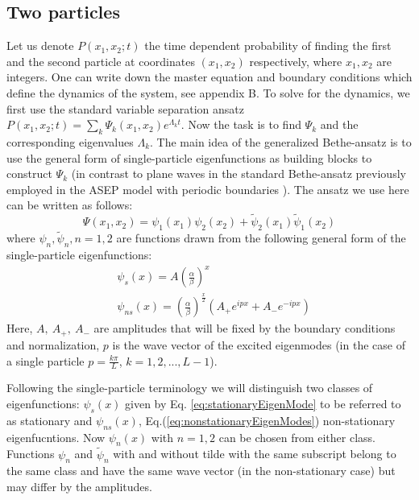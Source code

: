 \documentclass[aps,showpacs,twocolumn,floatfix,prx,superscriptaddress]{revtex4-1}
\begin{document}
\subsection{Two particles}
Let us denote $P(x_1, x_2; t)$ the time dependent probability of finding the first and the second particle at coordinates $(x_1, x_2)$ respectively, where $x_1, x_2$ are integers. One can write down the master equation and boundary conditions which define the dynamics of the system, see appendix B. To solve for the dynamics, we first use the standard variable separation ansatz $P(x_1, x_2; t) = \sum_k { \Psi_k(x_1, x_2) e^{\Lambda_k t}}$. Now the task is to find $\Psi_k$ and the corresponding eigenvalues $\Lambda_k$. The main idea of the generalized Bethe-ansatz is to use the general form of single-particle eigenfunctions as building blocks to construct $\Psi_k$ (in contrast to plane waves in the standard Bethe-ansatz previously employed in the ASEP model with periodic boundaries \cite{Derrida1998,Mallick2011}). The ansatz we use here can be written as follows:
\begin{equation}
    \label{eq:ansatzTwo}
    \Psi(x_1, x_2) = \psi_1(x_1)\psi_2(x_2) + \tilde{\psi}_2(x_1)\tilde{\psi}_1(x_2)
\end{equation}
where $\psi_n, \tilde{\psi}_n, n=1,2$ are functions drawn from the following general form of the single-particle eigenfunctions:
\begin{subequations}
    \label{eq:eigenModes}
\begin{eqnarray}
    \label{eq:stationaryEigenMode}
    &\psi_s(x)  =  A\left(\frac{\alpha}{\beta}\right)^x \\
    \label{eq:nonstationaryEigenModes}
    &\psi_{ns}(x)  =  \left(\frac{\alpha}{\beta}\right)^{\frac{x}{2}}
    \left(A_+ e^{ipx} +  A_-e^{-ipx}\right) 
\end{eqnarray}
\end{subequations}
Here, $A,~A_+,~A_-$ are amplitudes that will be fixed by the boundary conditions and normalization, $p$ is the wave vector of the excited eigenmodes (in the case of a single particle $p=\frac{k\pi}{L}$, $k=1,2,...,L-1$).

Following the single-particle terminology we will distinguish two classes of eigenfunctions: $\psi_s(x)$ given by Eq. \eqref{eq:stationaryEigenMode} to be referred to as stationary and $\psi_{ns}(x)$, Eq.(\ref{eq:nonstationaryEigenModes}) non-stationary eigenfucntions. Now $\psi_n(x)$ with $n=1,2$ can be chosen from either class. Functions $\psi_n$ and  $\tilde{\psi}_n$  with and without tilde with the same subscript belong to the same class and have the same wave vector (in the non-stationary case) but may differ by the amplitudes. %
\end{document}
